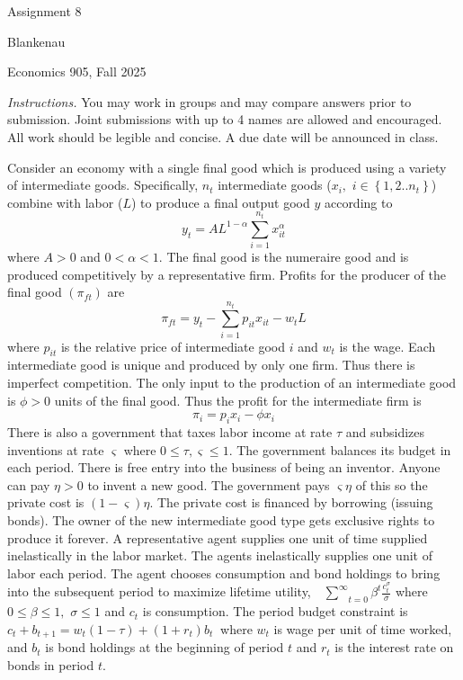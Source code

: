 \documentclass[11pt]{article}
\begin{document}
\begin{center}
{\LARGE Assignment 8}
\end{center}

\noindent Blankenau

\noindent Economics 905, Fall 2025

\noindent \noindent \textit{Instructions.} You may work in groups and may
compare answers prior to submission. Joint submissions with up to 4 names
are allowed and encouraged. All work should be legible and concise. A due
date will be announced in class.

Consider an economy with a single final good which is produced using a
variety of intermediate goods. Specifically, $n_{t}$ intermediate goods ($%
x_{i},$ $i\in \left\{ 1,2..n_{t}\right\} $) combine with labor ($L$) to
produce a final output good $y$ according to 
\begin{equation*}
y_{t}=AL^{1-\alpha }\overset{n_{t}}{\underset{i=1}{\sum }}x_{it}^{\alpha }
\end{equation*}%
where $A>0$ and $0<\alpha <1.$ The final good is the numeraire good and is
produced competitively by a representative firm. Profits for the producer of
the final good $\left( \pi _{ft}\right) $ are 
\begin{equation*}
\pi _{ft}=y_{t}-\overset{n_{t}}{\underset{i=1}{\sum }}p_{it}x_{it}-w_{t}L
\end{equation*}%
where $p_{it}$ is the relative price of intermediate good $i$ and $w_{t}$ is
the wage. Each intermediate good is unique and produced by only one firm.
Thus there is imperfect competition. The only input to the production of an
intermediate good is $\phi >0$ units of the final good. Thus the profit for
the intermediate firm is%
\begin{equation*}
\pi _{i}=p_{i}x_{i}-\phi x_{i}
\end{equation*}%
There is also a government that taxes labor income at rate $\tau $ and
subsidizes inventions at rate $\varsigma $ where $0\leq \tau ,\varsigma \leq
1.$ The government balances its budget in each period. There is free entry
into the business of being an inventor. Anyone can pay $\eta >0$ to invent a
new good. The government pays $\varsigma \eta $ of this so the private cost
is $\left( 1-\varsigma \right) \eta .$ The private cost is financed by
borrowing (issuing bonds). The owner of the new intermediate good type gets
exclusive rights to produce it forever. A representative agent supplies one
unit of time supplied inelastically in the labor market. The agents
inelastically supplies one unit of labor each period. The agent chooses
consumption and bond holdings to bring into the subsequent period to
maximize lifetime utility, $\underset{t=0}{\overset{\infty }{\text{ }\sum }}%
\beta ^{t}\frac{c_{t}^{\sigma }}{\sigma }$ where $0\leq \beta \leq 1,$ $%
\sigma \leq 1$ and $c_{t}$ is consumption$.$ The period budget constraint is 
$c_{t}+b_{t+1}=w_{t}\left( 1-\tau \right) +\left( 1+r_{t}\right) b_{t}\ $%
where $w_{t}$ is wage per unit of time worked, and $b_{t}$ is bond holdings
at the beginning of period $t$ and $r_{t}$ is the interest rate on bonds in
period $t$.
\end{document}
